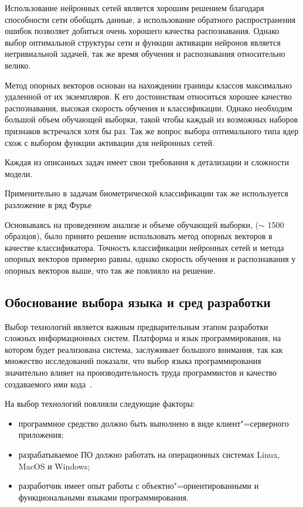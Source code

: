 Использование нейронных сетей является хорошим решением благодаря способности сети обобщать данные, а использование обратного распространения ошибок позволяет добиться очень хорошего качества распознавания. Однако выбор оптимальной структуры сети и функции активации нейронов является нетривиальной задачей, так же время обучения и распознавания относительно велико.

Метод опорных векторов основан на нахождении границы классов максимально удаленной от их экземпляров. К его достоинствам относиться хорошее качество распознавания, высокая скорость обучения и классификации. Однако необходим большой объем обучающей выборки, такой чтобы каждый из возможных наборов признаков встречался хотя бы раз. Так же вопрос выбора оптимального типа ядер схож с выбором функции активации для нейронных сетей.

Каждая из описанных задач имеет свои требования к детализации и сложности модели.

Применительно в задачам биометрической классификации так же используется разложение в ряд Фурье

Основываясь на проведенном анализе и объеме обучающей выборки, ($\sim$ 1500 образцов), было принято решение использовать метод опорных векторов в качестве классификатора. Точность классификации нейронных сетей и метода опорных векторов примерно равны, однако скорость обучения и распознавания у опорных векторов выше, что так же повлияло на решение.

\subsection{Обоснование выбора языка и сред разработки}
\label{sec:techs:intro}
Выбор технологий является важным предварительным этапом разработки сложных информационных систем. Платформа и язык программирования, на котором будет реализована система, заслуживает большого внимания, так как множество исследований показали, что выбор языка программирования значительно влияет на производительность труда программистов и качество создаваемого ими кода~\cite[c.~59]{mcconnell_2005}.

На выбор технологий повлияли следующие факторы:
\begin{itemize}
\item программное средство должно быть выполнено в виде клиент"=серверного приложения;
\item разрабатываемое ПО должно работать на операционных системах Linux, MacOS и Windows;
\item разработчик имеет опыт работы с объектно"=ориентированными и функциональными языками программирования.
\end{itemize}

